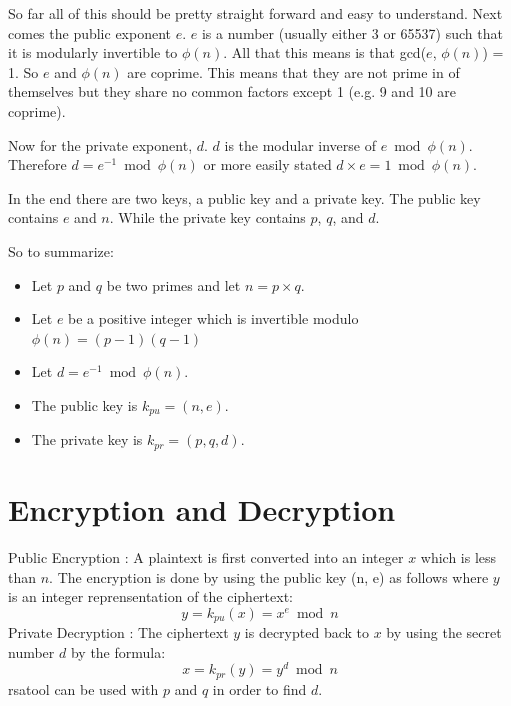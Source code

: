 \documentclass{report}
\begin{document}
So far all of this should be pretty straight forward and easy to understand.  Next comes the public exponent $e$.  $e$ is a number (usually either 3 or 65537) such that it is modularly invertible to $\phi(n)$.  All that this means is that gcd($e$, $\phi(n)$) = 1. So $e$ and $\phi(n)$ are coprime. This means that they are not prime in of themselves but they share no common factors except 1 (e.g. 9 and 10 are coprime).

Now for the private exponent, $d$.  $d$ is the modular inverse of $e \bmod \phi(n)$. Therefore $d = e^{-1} \bmod \phi(n)$ or more easily stated $d\times e = 1 \bmod \phi(n)$.  

In the end there are two keys, a public key and a private key.  The public key contains $e$ and $n$.  While the private key contains $p$, $q$, and $d$.

So to summarize:
\begin{itemize}
\item Let $p$ and $q$ be two primes and let $n = p \times q$.
\item Let $e$ be a positive integer which is invertible modulo $\phi(n) = (p - 1)(q - 1)$
\item Let $d = e^{-1} \bmod \phi(n)$.
\item The public key is $k_{pu} = (n, e)$.
\item The private key is $k_{pr} = (p, q, d)$.
\end{itemize}

\section{Encryption and Decryption}
\color{blue}Public Encryption \color{black}: A plaintext is first converted into an integer $x$ which is less than $n$. The encryption is done by using the public key (n, e) as follows where $y$ is an integer reprensentation of the ciphertext:
\[y = k_{pu}(x) = x^e \bmod n\]
\newline
\color{blue}Private Decryption \color{black}: The ciphertext $y$ is decrypted back to $x$ by using the secret number $d$ by the formula:
\[x = k_{pr}(y) = y^d \bmod n\]
\newline
rsatool can be used with $p$ and $q$ in order to find $d$.
\end{document}
